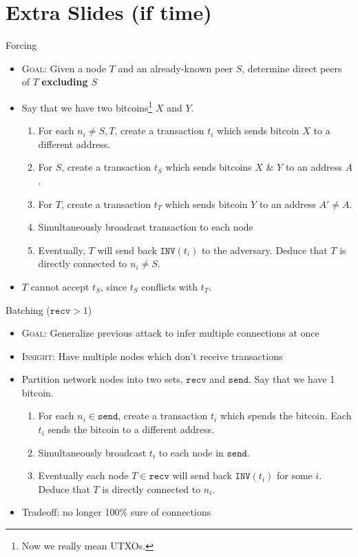 \documentclass{beamer}
\begin{document}
\section{Extra Slides (if time)}

\begin{frame}{Forcing}
\begin{itemize}
    \item \textsc{Goal:} Given a node $T$ and an already-known peer $S$, determine direct peers of $T$ \textbf{excluding $S$}
    \item Say that we have two bitcoins\footnote{Now we really mean UTXOs.} $X$ and $Y$.
    \begin{enumerate}
        \item For each $n_i \neq S, T$, create a transaction $t_i$ which sends bitcoin $X$ to a different address.
        \item For $S$, create a transaction $t_S$ which sends bitcoins $X$ \& $Y$ to an address $A$. 
        \item For $T$, create a transaction $t_T$ which sends bitcoin $Y$ to an address $A' \neq A$.
        \item Simultaneously broadcast transaction to each node
        \item Eventually, $T$ will send back $\texttt{INV}(t_i)$ to the adversary. Deduce that $T$ is directly connected to $n_i\neq S$.
    \end{enumerate}
    \item $T$ cannot accept $t_S$, since $t_S$ conflicts with $t_T$.
\end{itemize}
\end{frame}

\begin{frame}{Batching ($\texttt{recv} > 1$)}
\begin{itemize}
\item \textsc{Goal:} Generalize previous attack to infer multiple connections at once
\item \textsc{Insight:} Have multiple nodes which don't receive transactions
\item Partition network nodes into two sets, $\texttt{recv}$ and $\texttt{send}$. Say that we have 1 bitcoin.
\begin{enumerate}
    \item For each $n_i \in \texttt{send}$, create a transaction $t_i$ which spends the bitcoin. Each $t_i$ sends the bitcoin to a different address.
    \item Simultaneously broadcast $t_i$ to each node in $\texttt{send}$.
    \item Eventually each node $T \in \texttt{recv}$ will send back $\texttt{INV}(t_i)$ for some $i$. Deduce that $T$ is directly connected to $n_i$.
\end{enumerate}
\item Tradeoff: no longer 100\% sure of connections
\end{itemize}
\end{frame}
\end{document}

